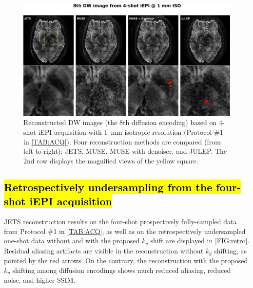 \documentclass[preprint,12pt,authoryear,review]{elsarticle}
\begin{document}
    \begin{figure}
        \centering
        \includegraphics[width=\textwidth]{../figures/fig3.png}
        \caption{Reconstructed DW images
        (the 8th diffusion encoding)
        based on 4-shot iEPI acquisition with 1~mm isotropic resolution
        (Protocol \#1 in \cref{TAB:ACQ}).
        Four reconstruction methods are compared (from left to right):
        JETS, MUSE, MUSE with denoiser, and JULEP.
        The 2nd row displays the magnified views of the yellow square.}
        \label{FIG:4shot_comp}
    \end{figure}


    \subsection{\hl{Retrospectively undersampling from the four-shot iEPI acquisition}}

    JETS reconstruction results on
    the four-shot prospectively fully-sampled data
    from Protocol \#1 in \cref{TAB:ACQ},
    as well as on the retrospectively undersampled one-shot data
    without and with the proposed $k_y$ shift
    are displayed in \cref{FIG:retro}.
    Residual aliasing artifacts are visible in the reconstruction
    without $k_y$ shifting, as pointed by the red arrows.
    On the contrary, the reconstruction
    with the proposed $k_y$ shifting among diffusion encodings
    shows much reduced aliasing, reduced noise, and higher SSIM.
\end{document}
